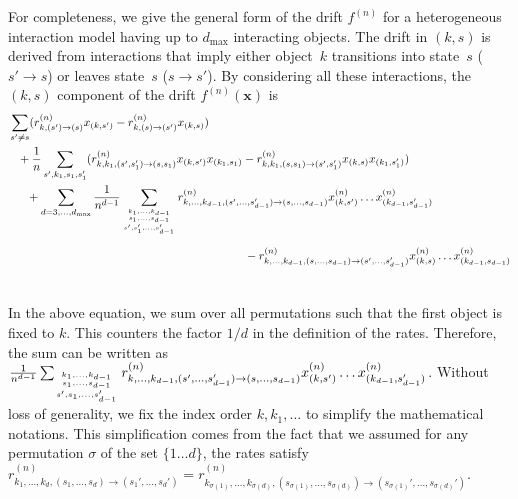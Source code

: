 \documentclass[acmsmall]{acmart}
\newcommand\bx{\mathbf{x}}
\newcommand\toN{^{(n)}}
\begin{document}
For completeness, we give the general form of the drift $f\toN$ for a heterogeneous interaction model having up to $d_{\max}$ interacting objects. The drift in $(k,s)$ is derived from interactions that imply either object~$k$ transitions into state~$s$ ($s' \rightarrow s$) or leaves state~$s$ ($s \rightarrow s'$). By considering all these interactions, the $(k,s)$ component of the drift $f\toN(\bx)$ is
\begin{align}
  & \sum_{s' \ne s} (r\toN_{k,(s') \rightarrow (s)} x_{(k,s')} - r\toN_{k,(s) \rightarrow (s')} x_{(k,s)})  \label{eq:drift_apx}\\
  & \phantom{+} + \frac1n \sum_{s',k_1, s_1,s_1'} (r\toN_{k,k_1,(s',s_1')\rightarrow (s,s_1)} x_{(k,s')}x_{(k_1,s_1)} - r\toN_{k,k_1,(s,s_1) \rightarrow (s',s'_1)} x_{(k,s)}x_{(k_1,s_1')}) \nonumber \\
  & \phantom{++} + \sum_{d=3,\hdots,d_{\max}} \frac{1}{n^{d-1}}\sum_{{k_1,...,k_{d-1} \atop s_1,...,s_{d-1}} \atop s', s_1', \hdots, s_{d-1}'} r_{k,\hdots,k_{d-1},(s',\hdots,s_{d-1}') \rightarrow (s,\hdots,s_{d-1})}\toN x_{(k,s')}^{(n)}\hdots x_{(k_{d-1},s_{d-1}')}^{(n)} \nonumber \\
  & \phantom{++ + \sum_{d=3,\hdots,d_{\max}}^{n} \frac{1}{n^{d-1}}\sum_{{k_1,...,k_{d-1} \atop s_1,...,s_{d-1}} \atop s', s_1', \hdots, s_{d-1}'}++++++} - r\toN_{k,\hdots,k_{d-1},(s,\hdots,s_{d-1}) \rightarrow (s',\hdots,s_{d-1}')} x_{(k,s)}^{(n)}\hdots x_{(k_{d-1},s_{d-1})}^{(n)} \nonumber
\end{align} 
In the above equation, we sum over all permutations such that the first object is fixed to $k$. This counters the factor $1/d$ in the definition of the rates. Therefore, the sum can be written as $\frac{1}{n^{d-1}}\sum_{{k_1,...,k_{d-1} \atop s_1,...,s_{d-1}} \atop s',s_1, \hdots, s_{d-1}'} r_{k,\hdots,k_{d-1},(s',\hdots,s_{d-1}') \rightarrow (s,\hdots,s_{d-1})}\toN x_{(k,s')}^{(n)}\hdots x_{(k_{d-1},s_{d-1}')}^{(n)}$. Without loss of generality, we fix the index order $k,k_1,\hdots$ to simplify the mathematical notations. This simplification comes from the fact that we assumed for any permutation $\sigma$ of the set $\{1\dots d\}$, the rates satisfy $r_{k_1, \dots, k_{d}, (s_1, \dots, s_{d}) \rightarrow (s_1', \dots, s_{d}')}\toN = r_{k_{\sigma(1)}, \dots, k_{\sigma(d)}, (s_{\sigma(1)}, \dots, s_{\sigma(d)}) \rightarrow (s_{\sigma(1)}', \dots, s_{\sigma(d)}')}\toN$.

\end{document}

